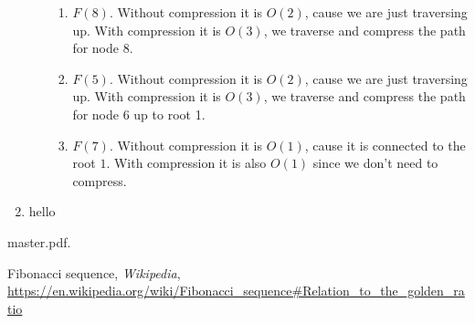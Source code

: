 \documentclass{article}
\begin{document}
\begin{enumerate}
\begin{enumerate}
\begin{enumerate}
      \item $F(8)$. Without compression it is $O(2)$, cause we are just traversing up.
      With compression it is $O(3)$, we traverse and compress the path for node 8.

      \item $F(5)$. Without compression it is $O(2)$, cause we are just traversing up.
      With compression it is $O(3)$, we traverse and compress the path for node 6 up to root 1.

      \item $F(7)$. Without compression it is $O(1)$, cause it is connected to the root $1$.
      With compression it is also $O(1)$ since we don't need to compress.
    \end{enumerate}
  \end{enumerate}
  \item hello

\end{enumerate}

\begin{thebibliography}{9}

master.pdf.

Fibonacci sequence, \emph{Wikipedia}, \url{https://en.wikipedia.org/wiki/Fibonacci_sequence#Relation_to_the_golden_ratio}

\end{thebibliography}
\end{document}
